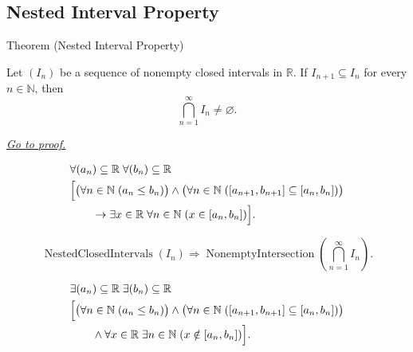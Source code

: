 
\subsection*{Nested Interval Property}









\begin{theorembox}{Theorem (Nested Interval Property)}
\begin{theorem}
\label{thm:nested-interval-theorem}
Let $(I_n)$ be a sequence of nonempty closed intervals in $\mathbb{R}$. If $I_{n+1}\subseteq I_n$ for every $n\in\mathbb{N}$, then
\[
  \bigcap_{n=1}^{\infty} I_n\neq\varnothing.
\]

\smallskip
\noindent
\hyperref[prf:nested-interval-theorem]{\textit{Go to proof.}}
\end{theorem}
\end{theorembox}

\begin{remark*}
\[
\begin{aligned}
&\forall (a_n)\subseteq\mathbb{R}\;\forall (b_n)\subseteq\mathbb{R}\;\\
&\Bigl[
\bigl(\forall n\in\mathbb{N}\;(a_n\le b_n)\bigr)
\land
\bigl(\forall n\in\mathbb{N}\;([a_{n+1},b_{n+1}]\subseteq [a_n,b_n])\bigr)
\\
&\qquad\rightarrow
\exists x\in\mathbb{R}\;\forall n\in\mathbb{N}\;(x\in [a_n,b_n])
\Bigr].
\end{aligned}
\]
\end{remark*}

\begin{remark*}
\[
\operatorname{NestedClosedIntervals}(I_n)\Longrightarrow
\operatorname{NonemptyIntersection}\!\left(\bigcap_{n=1}^{\infty}I_n\right).
\]
\end{remark*}

\begin{remark*}
\[
\begin{aligned}
&\exists (a_n)\subseteq\mathbb{R}\;\exists (b_n)\subseteq\mathbb{R}\;\\
&\Bigl[
\bigl(\forall n\in\mathbb{N}\;(a_n\le b_n)\bigr)
\land
\bigl(\forall n\in\mathbb{N}\;([a_{n+1},b_{n+1}]\subseteq [a_n,b_n])\bigr)
\\
&\qquad\land
\forall x\in\mathbb{R}\;\exists n\in\mathbb{N}\;(x\notin [a_n,b_n])
\Bigr].
\end{aligned}
\]
\end{remark*}

